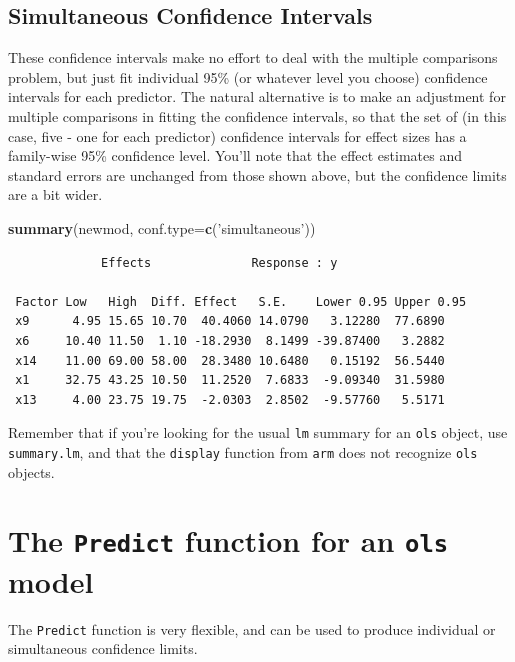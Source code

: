 \documentclass[]{book}
\newenvironment{Shaded}{\begin{snugshade}}{\end{snugshade}}
\newcommand{\KeywordTok}[1]{\textcolor[rgb]{0.13,0.29,0.53}{\textbf{#1}}}
\newcommand{\DataTypeTok}[1]{\textcolor[rgb]{0.13,0.29,0.53}{#1}}
\newcommand{\StringTok}[1]{\textcolor[rgb]{0.31,0.60,0.02}{#1}}
\newcommand{\NormalTok}[1]{#1}
\theoremstyle{definition}
\theoremstyle{definition}
\theoremstyle{definition}
\theoremstyle{remark}
\begin{document}
\subsection{Simultaneous Confidence
Intervals}\label{simultaneous-confidence-intervals}

These confidence intervals make no effort to deal with the multiple
comparisons problem, but just fit individual 95\% (or whatever level you
choose) confidence intervals for each predictor. The natural alternative
is to make an adjustment for multiple comparisons in fitting the
confidence intervals, so that the set of (in this case, five - one for
each predictor) confidence intervals for effect sizes has a family-wise
95\% confidence level. You'll note that the effect estimates and
standard errors are unchanged from those shown above, but the confidence
limits are a bit wider.

\begin{Shaded}
\begin{Highlighting}[]
\KeywordTok{summary}\NormalTok{(newmod, }\DataTypeTok{conf.type=}\KeywordTok{c}\NormalTok{(}\StringTok{'simultaneous'}\NormalTok{))}
\end{Highlighting}
\end{Shaded}

\begin{verbatim}
             Effects              Response : y 

 Factor Low   High  Diff. Effect   S.E.    Lower 0.95 Upper 0.95
 x9      4.95 15.65 10.70  40.4060 14.0790   3.12280  77.6890   
 x6     10.40 11.50  1.10 -18.2930  8.1499 -39.87400   3.2882   
 x14    11.00 69.00 58.00  28.3480 10.6480   0.15192  56.5440   
 x1     32.75 43.25 10.50  11.2520  7.6833  -9.09340  31.5980   
 x13     4.00 23.75 19.75  -2.0303  2.8502  -9.57760   5.5171   
\end{verbatim}

Remember that if you're looking for the usual \texttt{lm} summary for an
\texttt{ols} object, use \texttt{summary.lm}, and that the
\texttt{display} function from \texttt{arm} does not recognize
\texttt{ols} objects.

\section{\texorpdfstring{The \texttt{Predict} function for an
\texttt{ols}
model}{The Predict function for an ols model}}\label{the-predict-function-for-an-ols-model}

The \texttt{Predict} function is very flexible, and can be used to
produce individual or simultaneous confidence limits.
\end{document}
